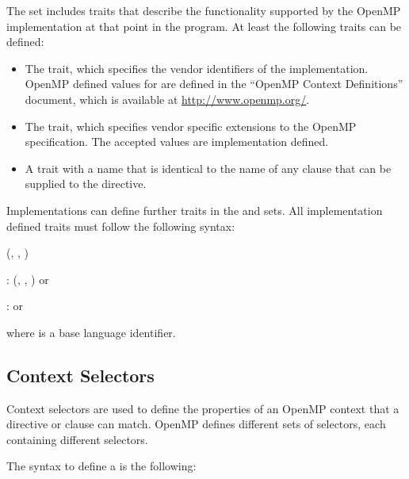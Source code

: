 The  set includes traits that describe the functionality 
supported by the OpenMP implementation at that point in the program. At least 
the following traits can be defined:

\begin{itemize}
\item The  trait, which specifies the vendor
      identifiers of the implementation. OpenMP defined values for 
      are defined in the ``OpenMP Context Definitions'' document, which is
      available at \url{http://www.openmp.org/}.
\item The  trait, which specifies vendor
      specific extensions to the OpenMP specification. The accepted
       values are implementation defined.
\item A trait with a name that is identical to the name of any clause that can be
      supplied to the  directive.
\end{itemize}

\clearpage  %
Implementations can define further traits in the  and 
sets. All implementation defined traits must follow the following syntax:

\begin{ompSyntax}
\plc{identifier[}(\plc{context-element[}, \plc{context-element[}, \plc{...]]})\plc{]}

:
  \plc{identifier[}(\plc{context-element[}, \plc{context-element[}, \plc{...]]})\plc{]}
  or

:
  or
\end{ompSyntax}

where  is a base language identifier.

\subsection{Context Selectors}
\label{subsec:Context Selectors}

Context selectors are used to define the properties of an OpenMP context that
a directive or clause can match. OpenMP defines different sets of selectors, 
each containing different selectors.

The syntax to define a  is the following:

